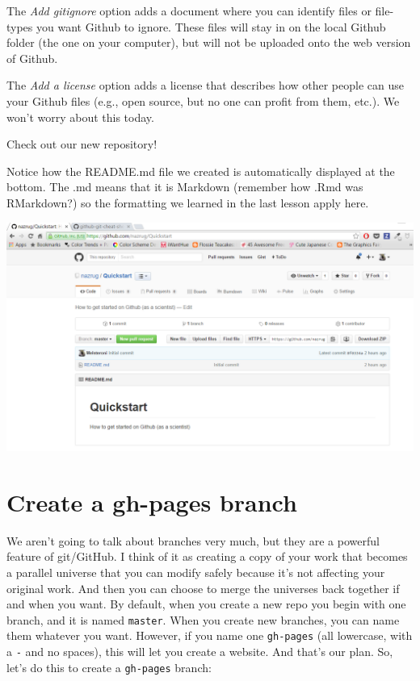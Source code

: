 \documentclass[]{book}
\begin{document}
The \emph{Add gitignore} option adds a document where you can identify files or file-types you want Github to ignore. These files will stay in on the local Github folder (the one on your computer), but will not be uploaded onto the web version of Github.

The \emph{Add a license} option adds a license that describes how other people can use your Github files (e.g., open source, but no one can profit from them, etc.). We won't worry about this today.

Check out our new repository!

Notice how the README.md file we created is automatically displayed at the bottom. The .md means that it is Markdown (remember how .Rmd was RMarkdown?) so the formatting we learned in the last lesson apply here.

\includegraphics{img/new_repository.png}

\hypertarget{create-a-gh-pages-branch}{%
\section{Create a gh-pages branch}\label{create-a-gh-pages-branch}}

We aren't going to talk about branches very much, but they are a powerful feature of git/GitHub. I think of it as creating a copy of your work that becomes a parallel universe that you can modify safely because it's not affecting your original work. And then you can choose to merge the universes back together if and when you want. By default, when you create a new repo you begin with one branch, and it is named \texttt{master}. When you create new branches, you can name them whatever you want. However, if you name one \texttt{gh-pages} (all lowercase, with a \texttt{-} and no spaces), this will let you create a website. And that's our plan. So, let's do this to create a \texttt{gh-pages} branch:
\end{document}
